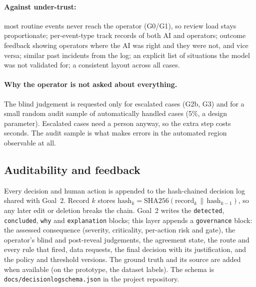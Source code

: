 \documentclass[11pt,a4paper]{article}
\renewcommand{\_}{\textunderscore\allowbreak}
\newcommand{\lvl}[1]{\textsf{#1}}
\begin{document}
\paragraph{Against under-trust:} most routine events never reach the operator (\lvl{G0}/\lvl{G1}), so review
load stays proportionate; per-event-type track records of both AI and operators; outcome feedback showing
operators where the AI was right and they were not, and vice versa; similar past incidents from the log; an
explicit list of situations the model was not validated for; a consistent layout across all cases.

\paragraph{Why the operator is not asked about everything.} The blind judgement is requested only for escalated
cases (\lvl{G2b}, \lvl{G3}) and for a small random audit sample of automatically handled cases (5\%, a design parameter). Escalated cases need a person anyway, so the extra step costs seconds. The audit sample is what makes
errors in the automated region observable at all.

\subsection{Auditability and feedback}
Every decision and human action is appended to the hash-chained decision log shared with Goal~2. Record $k$
stores $\mathrm{hash}_k=\mathrm{SHA256}(\mathrm{record}_k\,\|\,\mathrm{hash}_{k-1})$, so any later edit or
deletion breaks the chain. Goal~2 writes the \texttt{detected}, \texttt{concluded}, \texttt{why} and
\texttt{explanation} blocks; this layer appends a \texttt{governance} block: the assessed consequence (severity,
criticality, per-action risk and gate), the operator's blind and post-reveal judgements, the agreement state,
the route and every rule that fired, data requests, the final decision with its justification, and the policy
and threshold versions. The ground truth and its source are added when available (on the prototype, the dataset
labels). The schema is \texttt{docs/decision\_log\_schema.json} in the project repository.
\end{document}
